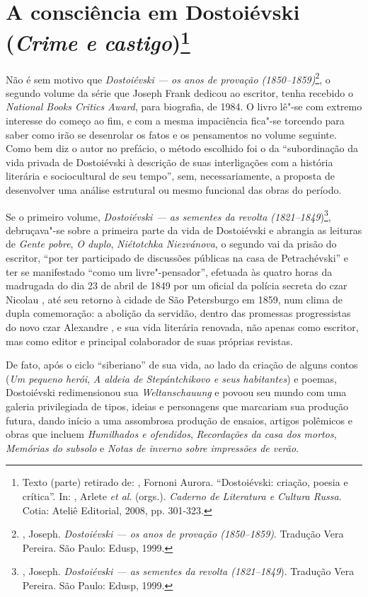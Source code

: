 \chapter{A consciência em Dostoiévski (\emph{Crime e castigo})\footnote{Texto (parte) retirado de: , Fornoni Aurora. ``Dostoiévski: criação, poesia e crítica''. In: , Arlete \emph{et al}. (orgs.). \emph{Caderno de Literatura e Cultura Russa}. Cotia: Ateliê Editorial, 2008, pp. 301-323.}}

Não é sem motivo que \emph{Dostoiévski --- os anos de provação (1850--1859)}\footnote{, Joseph. \emph{Dostoiévski --- os anos de   provação (1850--1859)}. Tradução Vera Pereira. São Paulo: Edusp, 1999.}, o segundo volume da série que Joseph Frank dedicou ao escritor, tenha recebido o \emph{National Books Critics Award}, para biografia, de 1984. O livro lê"-se com extremo interesse do começo ao fim, e com a mesma impaciência fica"-se torcendo para saber como irão se desenrolar os fatos
e os pensamentos no volume seguinte. Como bem diz o autor no prefácio, o método escolhido foi o da ``subordinação da vida privada de Dostoiévski à descrição de suas interligações com a história literária e sociocultural de seu tempo'', sem, necessariamente, a proposta de desenvolver uma análise estrutural ou mesmo funcional das obras do período.

Se o primeiro volume, \emph{Dostoiévski --- as sementes da revolta
(1821--1849})\footnote{, Joseph. \emph{Dostoiévski --- as sementes
  da revolta (1821--1849}). Tradução Vera Pereira. São Paulo: Edusp,
  1999.}, debruçava"-se sobre a primeira parte da vida de Dostoiévski e
abrangia as leituras de \emph{Gente pobre}, \emph{O duplo},
\emph{Niétotchka Niezvánova}, o segundo vai da prisão do escritor, ``por
ter participado de discussões públicas na casa de Petrachévski'' e ter
se manifestado ``como um livre"-pensador'', efetuada às quatro horas da
madrugada do dia 23 de abril de 1849 por um oficial da polícia secreta
do czar Nicolau , até seu retorno à cidade de São Petersburgo em 1859,
num clima de dupla comemoração: a abolição da servidão, dentro das
promessas progressistas do novo czar Alexandre , e sua vida literária
renovada, não apenas como escritor, mas como editor e principal
colaborador de suas próprias revistas.

De fato, após o ciclo ``siberiano'' de sua vida, ao lado da criação de
alguns contos (\emph{Um pequeno herói}, \emph{A aldeia de Stepántchikovo
e seus habitantes}) e poemas, Dostoiévski redimensionou sua
\emph{Weltanschauung} e povoou seu mundo com uma galeria privilegiada de
tipos, ideias e personagens que marcariam sua produção futura, dando
início a uma assombrosa produção de ensaios, artigos polêmicos e obras
que incluem \emph{Humilhados e ofendidos}, \emph{Recordações da casa dos
mortos}, \emph{Memórias do subsolo} e \emph{Notas de inverno sobre
impressões de verão}.


